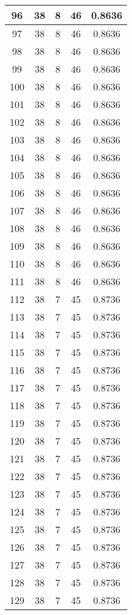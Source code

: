 \documentclass[letterpaper, 12pt]{article}
\begin{document}
\begin{longtable}{|c|c|c|c|c|}
\hline
96 & 38 & 8 & 46 & 0.8636 \\
\hline
97 & 38 & 8 & 46 & 0.8636 \\
\hline
98 & 38 & 8 & 46 & 0.8636 \\
\hline
99 & 38 & 8 & 46 & 0.8636 \\
\hline
100 & 38 & 8 & 46 & 0.8636 \\
\hline
101 & 38 & 8 & 46 & 0.8636 \\
\hline
102 & 38 & 8 & 46 & 0.8636 \\
\hline
103 & 38 & 8 & 46 & 0.8636 \\
\hline
104 & 38 & 8 & 46 & 0.8636 \\
\hline
105 & 38 & 8 & 46 & 0.8636 \\
\hline
106 & 38 & 8 & 46 & 0.8636 \\
\hline
107 & 38 & 8 & 46 & 0.8636 \\
\hline
108 & 38 & 8 & 46 & 0.8636 \\
\hline
109 & 38 & 8 & 46 & 0.8636 \\
\hline
110 & 38 & 8 & 46 & 0.8636 \\
\hline
111 & 38 & 8 & 46 & 0.8636 \\
\hline
112 & 38 & 7 & 45 & 0.8736 \\
\hline
113 & 38 & 7 & 45 & 0.8736 \\
\hline
114 & 38 & 7 & 45 & 0.8736 \\
\hline
115 & 38 & 7 & 45 & 0.8736 \\
\hline
116 & 38 & 7 & 45 & 0.8736 \\
\hline
117 & 38 & 7 & 45 & 0.8736 \\
\hline
118 & 38 & 7 & 45 & 0.8736 \\
\hline
119 & 38 & 7 & 45 & 0.8736 \\
\hline
120 & 38 & 7 & 45 & 0.8736 \\
\hline
121 & 38 & 7 & 45 & 0.8736 \\
\hline
122 & 38 & 7 & 45 & 0.8736 \\
\hline
123 & 38 & 7 & 45 & 0.8736 \\
\hline
124 & 38 & 7 & 45 & 0.8736 \\
\hline
125 & 38 & 7 & 45 & 0.8736 \\
\hline
126 & 38 & 7 & 45 & 0.8736 \\
\hline
127 & 38 & 7 & 45 & 0.8736 \\
\hline
128 & 38 & 7 & 45 & 0.8736 \\
\hline
129 & 38 & 7 & 45 & 0.8736 \\

\end{longtable}
\end{document}
